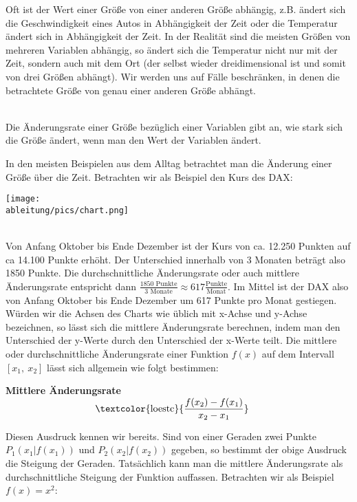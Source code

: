Oft ist der Wert einer Größe von einer anderen Größe abhängig, z.B. ändert sich die Geschwindigkeit eines Autos in Abhängigkeit der Zeit oder die Temperatur ändert sich in Abhängigkeit der Zeit. In der Realität sind die meisten Größen von mehreren Variablen abhängig, so ändert sich die Temperatur nicht nur mit der Zeit, sondern auch mit dem Ort (der selbst wieder dreidimensional ist und somit von drei Größen abhängt). Wir werden uns auf Fälle beschränken, in denen die betrachtete Größe von genau einer anderen Größe abhängt.
\begin{tcolorbox}
	\phantom{ }\\
	\textcolor{loestc}{Die Änderungsrate einer Größe bezüglich einer Variablen gibt an, wie stark sich die Größe ändert, wenn man den Wert der Variablen ändert.}\\
\end{tcolorbox}
In den meisten Beispielen aus dem Alltag betrachtet man die Änderung einer Größe über die Zeit. Betrachten wir als Beispiel den Kurs des DAX:\\
\begin{minipage}[t]{\textwidth}
	\centering\texttt{[image: \\ableitung/pics/chart.png]}
\end{minipage}\\
Von Anfang Oktober bis Ende Dezember ist der Kurs von ca. 12.250 Punkten auf ca 14.100 Punkte erhöht. Der Unterschied innerhalb von 3 Monaten beträgt also 1850 Punkte. Die durchschnittliche Änderungsrate oder auch mittlere Änderungsrate entspricht dann \(\frac{1850\text{ Punkte}}{3\text{ Monate}}\approx 617\frac{\text{Punkte}}{\text{Monat}}\). Im Mittel ist der DAX also von Anfang Oktober bis Ende Dezember um 617 Punkte pro Monat gestiegen. Würden wir die Achsen des Charts wie üblich mit x-Achse und y-Achse bezeichnen, so lässt sich die mittlere Änderungsrate berechnen, indem man den Unterschied der y-Werte durch den Unterschied der x-Werte teilt.\newpage
Die mittlere oder durchschnittliche Änderungsrate einer Funktion \(f(x)\) auf dem Intervall \([x_1,\ x_2]\) lässt sich allgemein wie folgt bestimmen:
\begin{tcolorbox}
	\textbf{Mittlere Änderungsrate}\\
	\Large$\makebox[\linewidth]{\textcolor{loestc}{\(\dfrac{f(x_2)-f(x_1)}{x_2-x_1}\)}}$
\end{tcolorbox}
Diesen Ausdruck kennen wir bereits. Sind von einer Geraden zwei Punkte \(P_1(x_1\vert f(x_1))\) und \(P_2(x_2\vert f(x_2))\) gegeben, so bestimmt der obige Ausdruck die Steigung der Geraden. Tatsächlich kann man die mittlere Änderungsrate als durchschnittliche Steigung der Funktion auffassen. Betrachten wir als Beispiel \(f(x)=x^2\):\\
